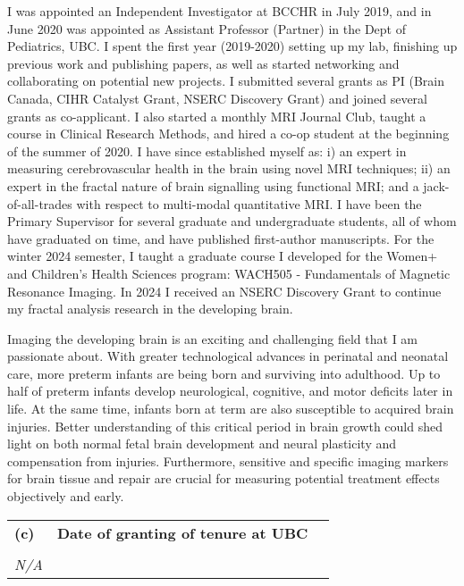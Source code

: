 \documentclass[11pt,notitlepage,english]{report}
\begin{document}
I was appointed an Independent Investigator at BCCHR in July 2019, and in June 2020 was appointed as Assistant Professor (Partner) in the Dept of Pediatrics, UBC. I spent the first year (2019-2020) setting up my lab, finishing up previous work and publishing papers, as well as started networking and collaborating on potential new projects. I submitted several grants as PI (Brain Canada, CIHR Catalyst Grant, NSERC Discovery Grant) and joined several grants as co-applicant. I also started a monthly MRI Journal Club, taught a course in Clinical Research Methods, and hired a co-op student at the beginning of the summer of 2020. I have since established myself as: i) an expert in measuring cerebrovascular health in the brain using novel MRI techniques; ii) an expert in the fractal nature of brain signalling using functional MRI; and a jack-of-all-trades with respect to multi-modal quantitative MRI. I have been the Primary Supervisor for several graduate and undergraduate students, all of whom have graduated on time, and have published first-author manuscripts. For the winter 2024 semester, I taught a graduate course I developed for the Women+ and Children's Health Sciences program: WACH505 - Fundamentals of Magnetic Resonance Imaging. In 2024 I received an NSERC Discovery Grant to continue my fractal analysis research in the developing brain.

Imaging the developing brain is an exciting and challenging field that I am passionate about. With greater technological advances in perinatal and neonatal care, more preterm infants are being born and surviving into adulthood. Up to half of preterm infants develop neurological, cognitive, and motor deficits later in life. At the same time, infants born at term are also susceptible to acquired brain injuries. Better understanding of this critical period in brain growth could shed light on both normal fetal brain development and neural plasticity and compensation from injuries. Furthermore, sensitive and specific imaging markers for brain tissue and repair are crucial for measuring potential treatment effects objectively and early.

\vspace{5pt}
\begin{tabular}{L{.5cm} L{8cm} L{6.9cm}}
  \textbf{(c)} & \textbf{Date of granting of tenure at UBC} \\
  \\
  \textit{N/A}                                              \\
\end{tabular}
\end{document}
